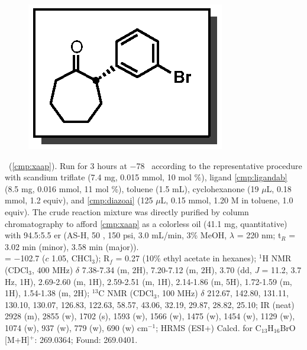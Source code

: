 \pagebreak
\begin{figure}
  \vspace{-22pt}
  \begin{center}
    \includegraphics[scale=0.8]{chp_asymmetric/images/xaap}
  \end{center}
  \vspace{-30pt}
\end{figure}\noindent \textbf{\CMPxaap}\ (\ref{cmp:xaap}). Run for 3 hours
at $-$78 \degc\  according to the representative procedure with scandium triflate (7.4
mg, 0.015 mmol, 10 mol \%), ligand \ref{cmp:ligandab} (8.5 mg, 0.016 mmol, 11
mol \%), toluene (1.5 mL), cyclohexanone (19 $\mu$L, 0.18 mmol, 1.2 equiv), and
\ref{cmp:diazoai} (125 $\mu$L, 0.15 mmol, 1.20 M in toluene, 1.0 equiv). The
crude reaction mixture was directly purified by column chromatography to afford
\ref{cmp:xaap} as a colorless oil (41.1 mg, quantitative) with 94.5:5.5 er
(AS-H, 50 \degc, 150 psi, 3.0 mL/min, 3\% MeOH, $\lambda$ = 220 nm; t$_R$ = 3.02
min (minor), 3.58 min (major)).\\
\noindent  \rotation = $-$102.7 ($c$ 1.05, CHCl$_3$); R$_f$ = 0.27 (10\% ethyl
acetate in hexanes); $^1$H NMR (CDCl$_3$, 400 MHz) $\delta$ 7.38-7.34 (m, 2H),
7.20-7.12 (m, 2H), 3.70 (dd, \textit{J} = 11.2, 3.7 Hz, 1H), 2.69-2.60 (m, 1H),
2.59-2.51 (m, 1H), 2.14-1.86 (m, 5H), 1.72-1.59 (m, 1H), 1.54-1.38 (m, 2H);
$^{13}$C NMR (CDCl$_3$, 100 MHz) $\delta$ 212.67, 142.80, 131.11, 130.10,
130.07, 126.83, 122.63, 58.57, 43.06, 32.19, 29.87, 28.82, 25.10; IR (neat) 2928
(m), 2855 (w), 1702 (s), 1593 (w), 1566 (w), 1475 (w), 1454 (w), 1129 (w), 1074
(w), 937 (w), 779 (w), 690 (w) cm$^{-1}$; HRMS (ESI+) Calcd. for
C$_{13}$H$_{16}$BrO [M+H]$^+$: 269.0364; Found: 269.0401. \\
